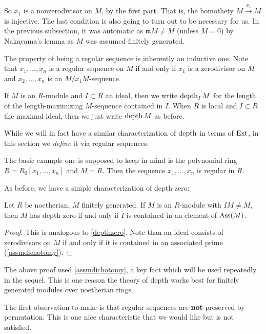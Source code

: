 So $x_1$ is a nonzerodivisor on $M$, by the first part. That is, the homothety
$M \stackrel{x_1}{\to} M$ is injective. 
The last condition is also going to turn out to be necessary for us. In the
previous subsection, it was automatic as $\mathfrak{m}M \neq M$ (unless $M =
0$) by Nakayama's lemma as $M$ was assumed finitely generated.	


The property of being a regular sequence is inherently an inductive one. Note
that $x_1, \dots, x_n$ is a regular sequence on $M$ if and only if $x_1$ is a
zerodivisor on $M$ and $x_2, \dots, x_n$ is an $M/x_1 M$-sequence.


\begin{definition} 
If $M$ is an $R$-module and $I \subset R$ an ideal, then we write $\operatorname{depth}_I M$
for the length of the length-maximizing $M$-sequence contained in $I$.
When $R$ is local and $I \subset R$ the maximal ideal, then we just write
$\operatorname{depth} M$ as before.
\end{definition} 

While we will in fact have a similar characterization of $\operatorname{depth}$ in terms of
$\operatorname{Ext}$, in this section we \emph{define} it via regular sequences.

\begin{example} 
The basic example one is supposed to keep in mind is the polynomial ring $R =
R_0[x_1, \dots, x_n]$ and $M = R$. Then the sequence $x_1, \dots, x_n$ is
regular in $R$.
\end{example} 

As before, we have a simple characterization of depth zero:
\begin{proposition} Let $R$ be noetherian, $M$ finitely generated.
If $M$ is an $R$-module with $IM \neq M$, then $M$ has depth zero if and only
if $I $ is contained in an element of $\operatorname{Ass}(M)$.
\end{proposition} 
\begin{proof} 
This is analogous to \cref{depthzero}. Note than an ideal consists of
zerodivisors on $M$ if and only if it is contained in an associated prime
(\cref{assmdichotomy}).
\end{proof} 

The above proof used \cref{assmdichotomy}, a key fact which will be used
repeatedly in the sequel.
This is one reason the theory of depth works best for finitely generated
modules over noetherian rings.

The first observation to make is that regular sequences are \textbf{not}
preserved by permutation. This is one nice characteristic that we would like
but is not satisfied.

